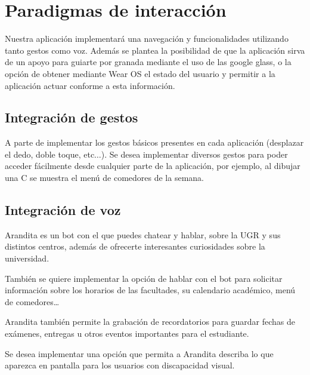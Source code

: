 \section{Paradigmas de interacción}

Nuestra aplicación implementará una navegación y funcionalidades utilizando tanto gestos como voz. Además se plantea la posibilidad de que la aplicación sirva de un apoyo para guiarte por granada mediante el uso de las google glass, o la opción de obtener mediante Wear OS el estado del usuario y permitir a la aplicación actuar conforme a esta información.

\subsection{Integración de gestos}
A parte de implementar los gestos básicos presentes en cada aplicación (desplazar el dedo, doble toque, etc$\ldots$). Se desea implementar diversos gestos para poder acceder fácilmente desde cualquier parte de la aplicación, por ejemplo, al dibujar una C se muestra el menú de comedores de la semana.

\subsection{Integración de voz}

Arandita es un bot con el que puedes chatear y hablar, sobre la UGR y sus distintos centros, además de ofrecerte interesantes curiosidades sobre la universidad.

También se quiere implementar la opción de hablar con el bot para solicitar  información sobre los horarios de las facultades, su calendario académico, menú de comedores…

Arandita también permite la grabación de recordatorios para guardar fechas de exámenes, entregas u otros eventos importantes para el estudiante.

Se desea implementar una opción que permita a Arandita describa lo que aparezca en pantalla para los usuarios con discapacidad visual.

